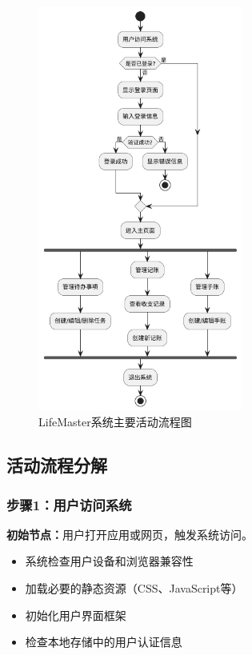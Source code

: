 \documentclass[a4paper]{article}
\begin{document}
\begin{figure}[H]
\centering
\includegraphics[width=0.6\textwidth]{img/activity_diagram.png}
\caption{LifeMaster系统主要活动流程图}
\end{figure}

\subsection{活动流程分解}

\subsubsection{步骤1：用户访问系统}

\textbf{初始节点：}用户打开应用或网页，触发系统访问。

\begin{itemize}
    \item 系统检查用户设备和浏览器兼容性
    \item 加载必要的静态资源（CSS、JavaScript等）
    \item 初始化用户界面框架
    \item 检查本地存储中的用户认证信息
\end{itemize}
\end{document}
